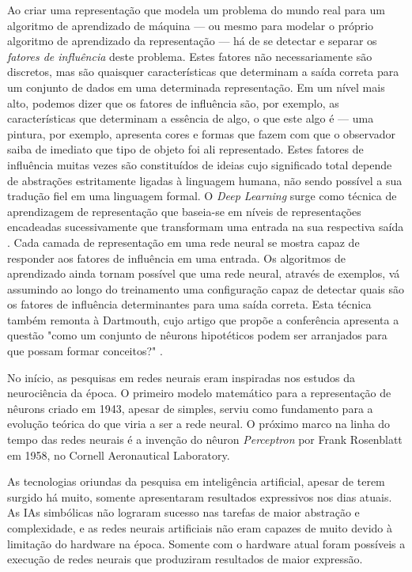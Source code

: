 \documentclass[12pt, a4paper]{article}
\begin{document}
Ao criar uma representação que modela um problema do mundo real para um algoritmo de aprendizado de máquina --- ou mesmo para modelar o próprio algoritmo de aprendizado da representação --- há de se detectar e separar os \emph{fatores de influência} deste problema. Estes fatores não necessariamente são discretos, mas são quaisquer características que determinam a saída correta para um conjunto de dados em uma determinada representação. Em um nível mais alto, podemos dizer que os fatores de influência são, por exemplo, as características que determinam a essência de algo, o que este algo é --- uma pintura, por exemplo, apresenta cores e formas que fazem com que o observador saiba de imediato que tipo de objeto foi ali representado. Estes fatores de influência muitas vezes são constituídos de ideias cujo significado total depende de abstrações estritamente ligadas à linguagem humana, não sendo possível a sua tradução fiel em uma linguagem formal. O \emph{Deep Learning} surge como técnica de aprendizagem de representação que baseia-se em níveis de representações encadeadas sucessivamente que transformam uma entrada na sua respectiva saída \cite{Goodfellow-et-al-2016}. Cada camada de representação em uma rede neural se mostra capaz de responder aos fatores de influência em uma entrada. Os algoritmos de aprendizado ainda tornam possível que uma rede neural, através de exemplos, vá assumindo ao longo do treinamento uma configuração capaz de detectar quais são os fatores de influência determinantes para uma saída correta. 
Esta técnica também remonta à Dartmouth, cujo artigo que propõe a conferência apresenta a questão "como um conjunto de nêurons hipotéticos podem ser arranjados para que possam formar conceitos?" \cite{dartmouth}.

No início, as pesquisas em redes neurais eram inspiradas nos estudos da neurociência da época. O primeiro modelo matemático para a representação de nêurons \cite{mcculloch_pitts} criado em 1943, apesar de simples, serviu como fundamento para a evolução teórica do que viria a ser a rede neural. O próximo marco na linha do tempo das redes neurais é a invenção do nêuron \emph{Perceptron} por Frank Rosenblatt em 1958, no Cornell Aeronautical Laboratory.

As tecnologias oriundas da pesquisa em inteligência artificial, apesar de terem surgido há muito, somente apresentaram resultados expressivos nos dias atuais. As IAs simbólicas não lograram sucesso nas tarefas de maior abstração e complexidade, e as redes neurais artificiais não eram capazes de muito devido à limitação do hardware na época. Somente com o hardware atual foram possíveis a execução de redes neurais que produziram resultados de maior expressão.
\end{document}

